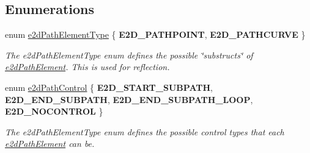 \subsection*{Enumerations}
\begin{DoxyCompactItemize}
\item 
enum \hyperlink{group__e2dPath_gabecf8438085bebe6b28b4a8fb69b1507}{e2d\-Path\-Element\-Type} \{ {\bfseries E2\-D\-\_\-\-P\-A\-T\-H\-P\-O\-I\-N\-T}, 
{\bfseries E2\-D\-\_\-\-P\-A\-T\-H\-C\-U\-R\-V\-E}
 \}
\begin{DoxyCompactList}\small\item\em The e2d\-Path\-Element\-Type enum defines the possible \char`\"{}substructs\char`\"{} of \hyperlink{structe2dPathElement}{e2d\-Path\-Element}. This is used for reflection. \end{DoxyCompactList}\item 
enum \hyperlink{group__e2dPath_ga0983472830124df9cdd854f7be1b6a06}{e2d\-Path\-Control} \{ {\bfseries E2\-D\-\_\-\-S\-T\-A\-R\-T\-\_\-\-S\-U\-B\-P\-A\-T\-H}, 
{\bfseries E2\-D\-\_\-\-E\-N\-D\-\_\-\-S\-U\-B\-P\-A\-T\-H}, 
{\bfseries E2\-D\-\_\-\-E\-N\-D\-\_\-\-S\-U\-B\-P\-A\-T\-H\-\_\-\-L\-O\-O\-P}, 
{\bfseries E2\-D\-\_\-\-N\-O\-C\-O\-N\-T\-R\-O\-L}
 \}
\begin{DoxyCompactList}\small\item\em The e2d\-Path\-Element\-Type enum defines the possible control types that each \hyperlink{structe2dPathElement}{e2d\-Path\-Element} can be. \end{DoxyCompactList}\end{DoxyCompactItemize}

